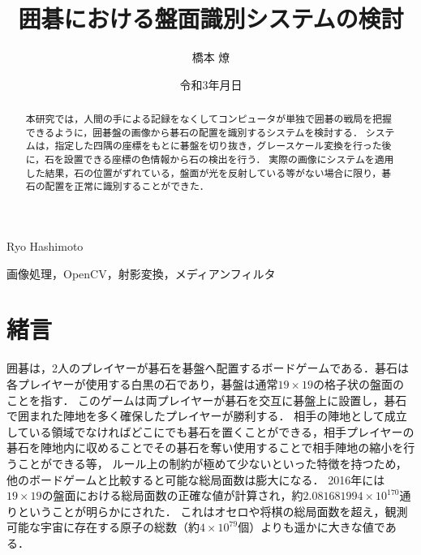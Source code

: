 \documentclass[openright]{nitocs}
\numberwithin{equation}{section}
\begin{document}
    \title{囲碁における盤面識別システムの検討}  %
    \author{橋本 燎}{Ryo Hashimoto} %
    \date{令和3年\number\month 月\number\day 日} %

    \begin{abstract} %
        本研究では，人間の手による記録をなくしてコンピュータが単独で囲碁の戦局を把握できるように，囲碁盤の画像から碁石の配置を識別するシステムを検討する．
        システムは，指定した四隅の座標をもとに碁盤を切り抜き，グレースケール変換を行った後に，石を設置できる座標の色情報から石の検出を行う．
        実際の画像にシステムを適用した結果，石の位置がずれている，盤面が光を反射している等がない場合に限り，碁石の配置を正常に識別することができた．
    \end{abstract}

    \begin{keyword} %
        画像処理，OpenCV，射影変換，メディアンフィルタ
    \end{keyword}


    \maketitle

    \section{緒言}  
    \label{sec:format}
        囲碁は，2人のプレイヤーが碁石を碁盤へ配置するボードゲームである．碁石は各プレイヤーが使用する白黒の石であり，碁盤は通常$19\times19$の格子状の盤面のことを指す．
        このゲームは両プレイヤーが碁石を交互に碁盤上に設置し，碁石で囲まれた陣地を多く確保したプレイヤーが勝利する．
        相手の陣地として成立している領域でなければどこにでも碁石を置くことができる，相手プレイヤーの碁石を陣地内に収めることでその碁石を奪い使用することで相手陣地の縮小を行うことができる等，
        ルール上の制約が極めて少ないといった特徴を持つため，他のボードゲームと比較すると可能な総局面数は膨大になる．
        2016年には$19\times19$の盤面における総局面数の正確な値が計算され，約$2.081681994 \times 10^{170}$通りということが明らかにされた\cite{numbers}．
        これはオセロや将棋の総局面数を超え，観測可能な宇宙に存在する原子の総数（約$4\times10^{79}$個）よりも遥かに大きな値である．
\end{document}
